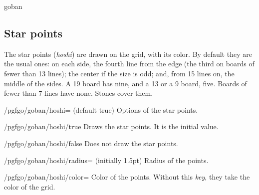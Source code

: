 \begin{environment}{{goban}}
	\subsection{Star points}
	\label{subsec:hoshi}

	The star points (\emph{hoshi}) are drawn on the grid, with its color. By default they are the usual ones: on each side, the fourth line from the edge (the third on boards of fewer than 13 lines); the center if the size is odd; and, from 15 lines on, the middle of the sides. A 19 board has nine, and a 13 or a 9 board, five. Boards of fewer than 7 lines have none. Stones cover them.

	\begin{key}{/pgfgo/goban/hoshi= (default true)}
		Options of the star points.

		\begin{codeexample}[]
			\begin{goban}[9]
			\end{goban}

			\begin{goban}[9, hoshi = false]
			\end{goban}
		\end{codeexample}
	\end{key}

	\begin{stylekey}{/pgfgo/goban/hoshi/true}
		Draws the star points. It is the initial value.
	\end{stylekey}

	\begin{stylekey}{/pgfgo/goban/hoshi/false}
		Does not draw the star points.
	\end{stylekey}

	\begin{key}{/pgfgo/goban/hoshi/radius= (initially 1.5pt)}
		Radius of the points.
	\end{key}

	\begin{key}{/pgfgo/goban/hoshi/color=}
		Color of the points. Without this \emph{key}, they take the color of the grid.

		\begin{codeexample}[]
			\begin{goban}[9, hoshi = {radius = 2.5pt, color = red}]
			\end{goban}
		\end{codeexample}
	\end{key}


\end{environment}
